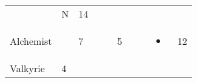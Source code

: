 \documentclass[12pt]{article}
\newcommand{\indexClass}[1]{\index{#1}}
\newcommand{\class}[1]{#1\indexClass{#1}}
\begin{document}
\begin{longtable}[]{@{}llllllllll@{}}
\begin{minipage}[t]{0.06\columnwidth}
\strut\end{minipage} &
\begin{minipage}[t]{0.07\columnwidth}\raggedright\strut
N
\strut\end{minipage} &
\begin{minipage}[t]{0.08\columnwidth}\raggedright\strut
14
\strut\end{minipage}\tabularnewline
\begin{minipage}[t]{0.13\columnwidth}\raggedright\strut
\class{Alchemist}
\strut\end{minipage} &
\begin{minipage}[t]{0.06\columnwidth}\raggedright\strut
\strut\end{minipage} &
\begin{minipage}[t]{0.06\columnwidth}\raggedright\strut
7
\strut\end{minipage} &
\begin{minipage}[t]{0.06\columnwidth}\raggedright\strut
\strut\end{minipage} &
\begin{minipage}[t]{0.06\columnwidth}\raggedright\strut
\strut\end{minipage} &
\begin{minipage}[t]{0.06\columnwidth}\raggedright\strut
5
\strut\end{minipage} &
\begin{minipage}[t]{0.06\columnwidth}\raggedright\strut
\strut\end{minipage} &
\begin{minipage}[t]{0.06\columnwidth}\raggedright\strut
\strut\end{minipage} &
\begin{minipage}[t]{0.07\columnwidth}\raggedright\strut
\begin{itemize}
\item
\end{itemize}
\strut\end{minipage} &
\begin{minipage}[t]{0.08\columnwidth}\raggedright\strut
12
\strut\end{minipage}\tabularnewline
\begin{minipage}[t]{0.13\columnwidth}\raggedright\strut
\class{Valkyrie}
\strut\end{minipage} &
\begin{minipage}[t]{0.06\columnwidth}\raggedright\strut
4
\strut\end{minipage} &
\begin{minipage}[t]{0.06\columnwidth}\raggedright\strut

\end{minipage}
\end{longtable}
\end{document}

